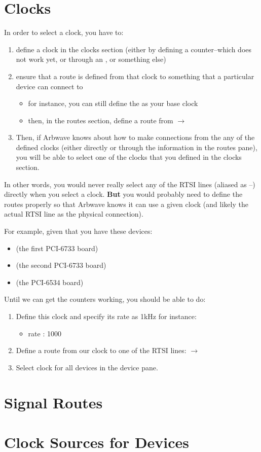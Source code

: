 \section{Clocks}
In order to select a clock, you have to:
\begin{enumerate}
  \item define a clock in the clocks section (either by defining a
    counter--which does not work yet, or through an , or something
    else)
  \item ensure that a route is defined from that clock to something that a
    particular device can connect to
    \begin{itemize}
      \item for instance, you can still define the  as your base
      clock
      \item then, in the routes section, define a route from
       $\rightarrow$ 
    \end{itemize}
  \item Then, if Arbwave knows about how to make connections from the any of the
    defined clocks (either directly or through the information in the routes
    pane), you will be able to select one of the clocks that you defined in the
    clocks section.
\end{enumerate}

In other words, you would never really select any of the RTSI lines (aliased as
--) directly when you select a clock.
\textbf{But} you would probably need to define the routes properly so that
Arbwave knows it can use a given clock (and likely the actual RTSI line as the
physical connection).

For example, given that you have these devices:
\begin{itemize}
  \item {}  (the first PCI-6733 board)
  \item {}  (the second PCI-6733 board)
  \item {}  (the PCI-6534 board)
\end{itemize}
Until we can get the counters working, you should be able to do:
\begin{enumerate}
  \item Define this clock and specify its rate as 1kHz for instance:\\
          \begin{itemize}
            \item rate : 1000
          \end{itemize}
  \item Define a route from our clock to one of the RTSI lines:
          $\rightarrow$ 
  \item Select  clock for all devices in the
    device pane.
\end{enumerate}


\section{Signal Routes}
\section{Clock Sources for Devices}
